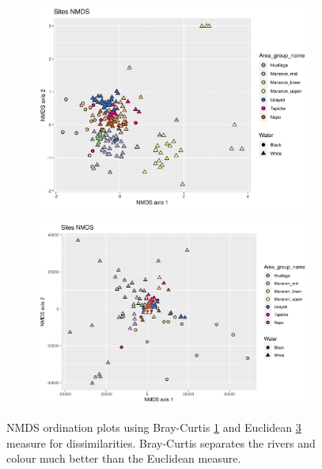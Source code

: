 \begin{figure}[h]
	\centering
	\begin{subfigure}{0.45\textwidth}
		\includegraphics[width=\textwidth]{nmdsotu12}
		\caption{}
		\label{fig:nmds}
	\end{subfigure}
	\begin{subfigure}{0.45\textwidth}
		\includegraphics[width=\textwidth]{nmdsotu12euc}
		\caption{}
		\label{fig:nmdseuc}
	\end{subfigure}
\caption{NMDS ordination plots using Bray-Curtis \ref{fig:nmds} and Euclidean \ref{fig:nmdseuc} measure for dissimilarities. Bray-Curtis separates the rivers and colour much better than the Euclidean measure.}
\end{figure} 
